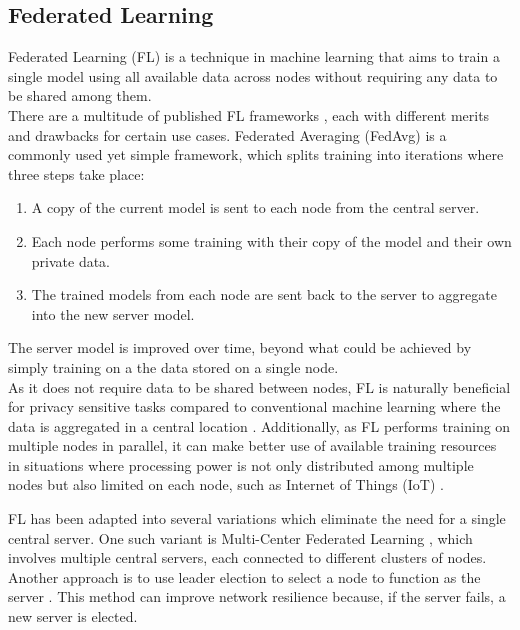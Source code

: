 \documentclass[letterpaper, 10 pt, conference]{ieeeconf}  %
\begin{document}
\subsection{Federated Learning}
Federated Learning (FL) \cite{survey_on_fed_learning} is a technique in machine learning that aims to train a single model using all available data across nodes without requiring any data to be shared among them. \\

There are a multitude of published FL frameworks \cite{fed_table_survey}, each with different merits and drawbacks for certain use cases. Federated Averaging (FedAvg) \cite{fed_learning} is a commonly used yet simple framework, which splits training into iterations where three steps take place:
\begin{enumerate}
	\item A copy of the current model is sent to each node from the central server.
	\item Each node performs some training with their copy of the model and their own private data.
	\item The trained models from each node are sent back to the server to aggregate into the new server model.
\end{enumerate}
The server model is improved over time, beyond what could be achieved by simply training on a the data stored on a single node. \\

As it does not require data to be shared between nodes, FL is naturally beneficial for privacy sensitive tasks compared to conventional machine learning where the data is aggregated in a central location \cite{fed_privacy}. Additionally, as FL performs training on multiple nodes in parallel, it can make better use of available training resources in situations where processing power is not only distributed among multiple nodes but also limited on each node, such as Internet of Things (IoT) \cite{fed_iot_2}.

FL has been adapted into several variations which eliminate the need for a single central server. One such variant is Multi-Center Federated Learning \cite{multi_center_fed_learning}, which involves multiple central servers, each connected to different clusters of nodes. Another approach is to use leader election to select a node to function as the server \cite{fed_leaderelec}. This method can improve network resilience because, if the server fails, a new server is elected.
\end{document}
